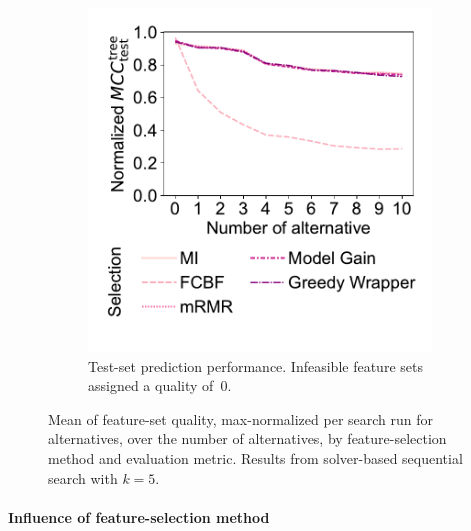 \documentclass{article}
\theoremstyle{definition}
\begin{document}
\begin{figure}[p]
\begin{subfigure}[t]{0.48\textwidth}
		\includegraphics[width=\textwidth, trim=20 35 15 15, clip]{plots/afs-impact-num-alternatives-fs-method-decision-tree-test-mcc-max-fillna.pdf}
		\caption{
			Test-set prediction performance.
			Infeasible feature sets assigned a quality of~0.
		}
		\label{fig:afs:impact-num-alternatives-fs-method-decision-tree-test-mcc-max-fillna}
	\end{subfigure}
	\caption{
		Mean of feature-set quality, max-normalized per search run for alternatives, over the number of alternatives, by feature-selection method and evaluation metric.
		Results from solver-based sequential search with $k=5$.
	}
	\label{fig:afs:impact-num-alternatives-fs-method-quality}
\end{figure}

\paragraph{Influence of feature-selection method}
\end{document}
